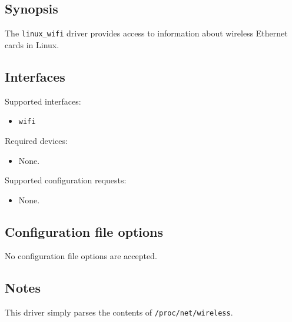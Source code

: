 \subsection*{Synopsis}
The {\tt linux\_wifi} driver provides access to information about
wireless Ethernet cards in Linux.


\subsection*{Interfaces}

\noindent Supported interfaces:

\begin{itemize}
\item {\tt wifi}
\end{itemize}

\noindent Required devices:
\begin{itemize}
\item None.
\end{itemize}

\noindent Supported configuration requests:
\begin{itemize}
\item None.
\end{itemize}


\subsection*{Configuration file options}
No configuration file options are accepted.

\subsection*{Notes}
This driver simply parses the contents of {\tt /proc/net/wireless}.

